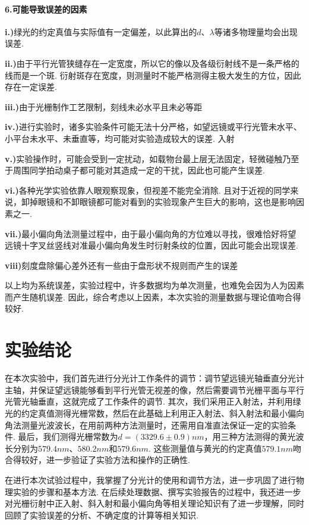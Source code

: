 \documentclass[UTF8]{ctexart}
\begin{document}
\paragraph{6.\quad 可能导致误差的因素}\quad\par
\textbf{i.)}绿光的约定真值与实际值有一定偏差，以此算出的$d$、$\lambda$等诸多物理量均会出现误差.\par
\textbf{ii.)}由于平行光管狭缝存在一定宽度，所以它的像以及各级衍射线不是一条严格的线而是一个斑. 衍射斑存在宽度，则测量时不能严格测得主极大发生的方位，因此存在一定误差.\par
\textbf{iii.)}由于光栅制作工艺限制，刻线未必水平且未必等距\par
\textbf{iv.)}进行实验时，诸多实验条件可能无法十分严格，如望远镜或平行光管未水平、小平台未水平、未垂直等，均可能对实验造成较大的误差.
入射\par
\textbf{v.)}实验操作时，可能会受到一定扰动，如载物台最上层无法固定，轻微碰触乃至于周围同学拍动桌子都可能对其造成一定的干扰，因此也可能产生误差.\par
\textbf{vi.)}各种光学实验依靠人眼观察现象，但视差不能完全消除. 且对于近视的同学来说，卸掉眼镜和不卸眼镜都可能对看到的实验现象产生巨大的影响，这也是影响因素之一.\par
\textbf{vii.)}最小偏向角法测量过程中，由于最小偏向角的方位难以寻找，很难恰好将望远镜十字叉丝竖线对准最小偏向角发生时衍射条纹的位置，因此可能会出现误差.\par
\textbf{viii)}刻度盘除偏心差外还有一些由于盘形状不规则而产生的误差\par
以上均为系统误差，实验过程中，许多数据均为单次测量，也难免会因为人为因素而产生随机误差. 因此，综合考虑以上因素，本次实验的测量数据与理论值吻合得较好.

\vspace{2em}
\section{实验结论}

在本次实验中，我们首先进行分光计工作条件的调节：调节望远镜光轴垂直分光计主轴，并保证望远镜能够看到平行光管无视差的像，然后需要调节光栅平面与平行光管光轴垂直，这就完成了工作条件的调节. 其次，我们采用正入射法，并利用绿光的约定真值测得光栅常数，然后在此基础上利用正入射法、斜入射法和最小偏向角法测量光波波长，在用前两种方法测量时，还需用自准直法保证一定的实验条件. 最后，我们测得光栅常数为$d=(3329.6\pm0.9)nm$，用三种方法测得的黄光波长分别为$579.4nm$、$580.2nm$和$579.6nm$. 这些测量值与黄光的约定真值$579.1nm$吻合得较好，进一步验证了实验方法和操作的正确性.\par
在进行本次试验过程中，我掌握了分光计的使用和调节方法，进一步巩固了进行物理实验的步骤和基本方法. 在后续处理数据、撰写实验报告的过程中，我还进一步对光栅衍射中正入射、斜入射和最小偏向角等相关理论知识有了进一步理解，同时回顾了实验误差的分析、不确定度的计算等相关知识.
\newpage
\end{document}
